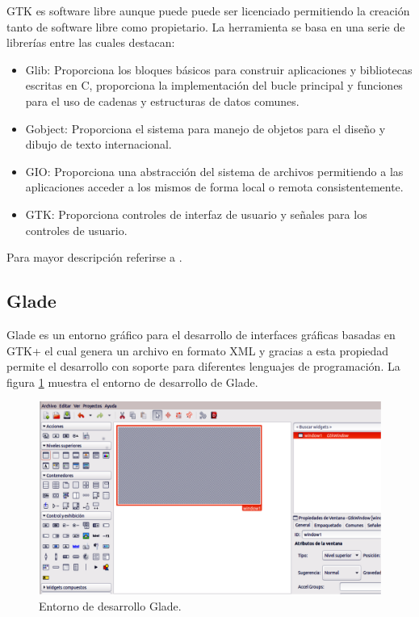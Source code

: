 GTK es software libre aunque puede puede ser licenciado permitiendo la creación tanto de software libre como propietario.
La herramienta se basa en una serie de librerías entre las cuales destacan:

\begin{itemize}
\item Glib: Proporciona los bloques básicos para construir aplicaciones y bibliotecas escritas en C, proporciona la implementación del bucle principal y funciones para el uso de cadenas y estructuras de datos comunes. 
\item Gobject: Proporciona el sistema para manejo de objetos para el diseño y dibujo de texto internacional.
\item GIO: Proporciona una abstracción del sistema de archivos permitiendo a las aplicaciones acceder a los mismos de forma local o remota consistentemente.
\item GTK: Proporciona controles de interfaz de usuario y señales para los controles de usuario.
\end{itemize}

Para mayor descripción referirse a \citep{GTK}.

\subsection{Glade}
Glade es un entorno gráfico para el desarrollo de interfaces gráficas basadas en GTK+ el cual genera un archivo en formato XML  y gracias a esta propiedad permite el desarrollo con soporte para diferentes lenguajes de programación.
La figura \ref{fig:glade} muestra el entorno de desarrollo de Glade.

\begin{figure}[h]
	\centering
	\includegraphics[scale=.4]{./Figures/glade.pdf}
	\caption{Entorno de desarrollo Glade.}
	\label{fig:glade}
\end{figure}

